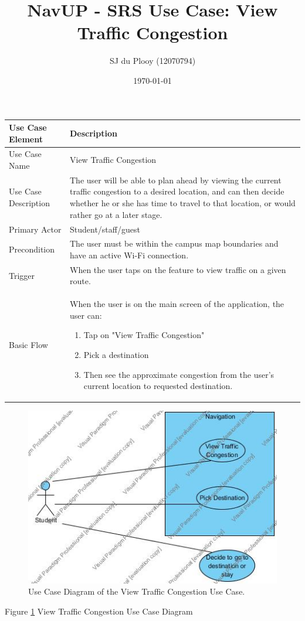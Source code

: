 \documentclass[12pt]{article}
\begin{document}
\title{NavUP - SRS Use Case: View Traffic Congestion}
\author{SJ du Plooy (12070794)}
\date{\today}
\maketitle


\begin{tabular}{|p{4cm}|p{10cm}|}
\hline

Use Case Element & Description \\
\hline

Use Case Name & 
View Traffic Congestion \\
\hline

Use Case Description & 
The user will be able to plan ahead by viewing the current traffic congestion to a desired location, and can then decide whether he or she has time to travel to that location, or would rather go at a later stage.   \\
\hline

Primary Actor & 
Student/staff/guest \\
\hline

Precondition & 
The user must be within the campus map boundaries and have an active Wi-Fi connection.   \\
\hline

Trigger & 
When the user taps on the feature to view traffic on a given route.   \\
\hline

Basic Flow & 
When the user is on the main screen of the application, the user can:
\begin{enumerate}
\item Tap on "View Traffic Congestion"
\item Pick a destination
\item Then see the approximate congestion from the user's current location to requested destination.
\end{enumerate} \\
\hline

\hline
\end{tabular}

\begin{figure}

\includegraphics[width=\linewidth]{UseCaseDiagram_ViewTrafficCongestion.jpg}
\caption{Use Case Diagram of the View Traffic Congestion Use Case.}
\label{fig:UCD1}

\end{figure}

Figure \ref{fig:UCD1} View Traffic Congestion Use Case Diagram
\end{document}
